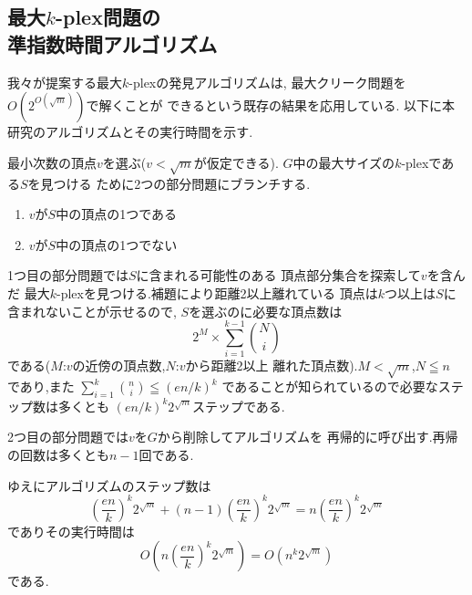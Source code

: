 \documentclass[a4j,twoside]{jarticle}
\begin{document}
\begin{論文概要}
\section{最大$k$-plex問題の \\ 準指数時間アルゴリズム}
我々が提案する最大$k$-plexの発見アルゴリズムは,
最大クリーク問題を$O(2^{O(\sqrt{m})})$で解くことが
できるという既存の結果を応用している. 
以下に本研究のアルゴリズムとその実行時間を示す.

最小次数の頂点$v$を選ぶ($v<\sqrt{m}$が仮定できる).
$G$中の最大サイズの$k$-plexである$S$を見つける
ために2つの部分問題にブランチする.
\begin{enumerate}
 \item $v$が$S$中の頂点の1つである
 \item $v$が$S$中の頂点の1つでない
\end{enumerate}

1つ目の部分問題では$S$に含まれる可能性のある
頂点部分集合を探索して$v$を含んだ
最大$k$-plexを見つける.補題により距離2以上離れている
頂点は$k$つ以上は$S$に含まれないことが示せるので,
$S$を選ぶのに必要な頂点数は
\[ 2^{M} \times  \sum_{i = 1}^{k - 1}\binom{N}{i}  \]
である($M$:$v$の近傍の頂点数,$N$:$v$から距離2以上
離れた頂点数).$M < \sqrt{m}$,$N \leqq n$ であり,また 
$ \sum_{i = 1}^{k}\binom{n}{i} \leqq ({en}/{k})^{k}$
であることが知られているので必要なステップ数は多くとも
$({en}/{k})^{k}2^{\sqrt{m}}$ステップである.

2つ目の部分問題では$v$を$G$から削除してアルゴリズムを
再帰的に呼び出す.再帰の回数は多くとも$n-1$回である.

ゆえにアルゴリズムのステップ数は
\[  {\left( \frac{en}{k} \right)}^{k}2^{\sqrt{m}} +  (n - 1){\left( \frac{en}{k} \right)}^{k}2^{\sqrt{m}} =n{\left( \frac{en}{k} \right)}^{k}2^{\sqrt{m}} \]
でありその実行時間は 
\[ O(n{\left( \frac{en}{k} \right)}^{k}2^{\sqrt{m}}) = O(n^{k}2^{\sqrt{m}}) \]
である.

\begin{comment}
\section{まとめと今後の課題}
今回の研究によって,最大$k$-plex問題を$O(n^{k}2^{\sqrt{m}})$時間で
解くアルゴリズムを得ることができた.このアルゴリズムでは
$S$に入る可能性のない頂点も探索しているので,これを改良して
$O(n^{k}2^{\sqrt{m}})$の境界を突破できるかが今後の課題となる.
\end{comment}




\clearpage                       %
\end{論文概要}                   %
\end{document}

